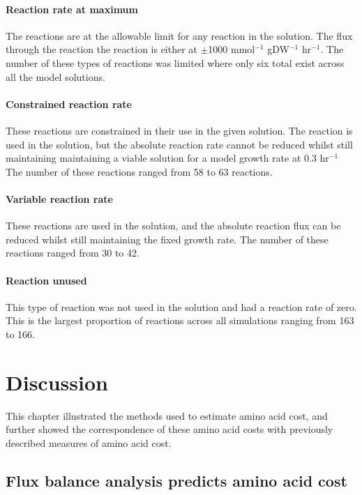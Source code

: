 \paragraph{Reaction rate at maximum}

The reactions are at the allowable limit for any reaction in the solution. The flux through the reaction the reaction is either at $\pm$1000 mmol$^{-1}$ gDW$^{-1}$ hr$^{-1}$. The number of these types of reactions was limited where only six total exist across all the model solutions.

\paragraph{Constrained reaction rate}

These reactions are constrained in their use in the given solution. The reaction is used in the solution, but the absolute reaction rate cannot be reduced whilst still maintaining maintaining a viable solution for a model growth rate at 0.3 hr$^{-1}$ The number of these reactions ranged from 58 to 63 reactions.

\paragraph{Variable reaction rate}

These reactions are used in the solution, and the absolute reaction flux can be reduced whilst still maintaining the fixed growth rate. The number of these reactions ranged from 30 to 42.

\paragraph{Reaction unused}

This type of reaction was not used in the solution and had a reaction rate of zero. This is the largest proportion of reactions across all simulations ranging from 163 to 166.

\clearpage

\section{Discussion}%

This chapter illustrated the methods used to estimate amino acid cost, and further showed the correspondence of these amino acid costs with previously described measures of amino acid cost.

\subsection{Flux balance analysis predicts amino acid cost}

